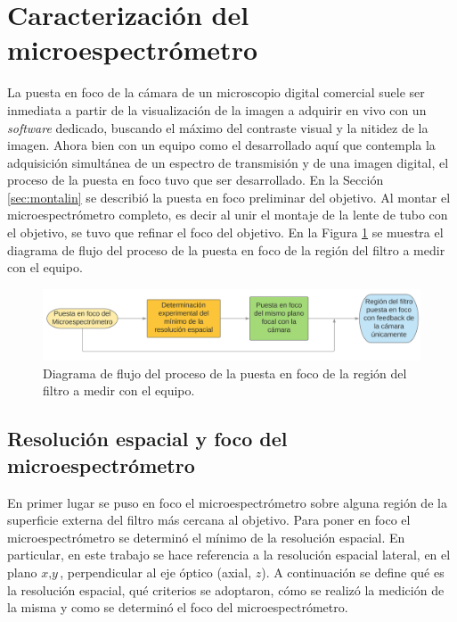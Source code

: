 \singlespacing
\section{Caracterización del microespectrómetro}
\label{sec:caractequipo}

\hspace{0.5cm}La puesta en foco de la cámara de un microscopio digital comercial suele ser inmediata a partir de la visualización de la imagen a adquirir en vivo con un \textit{software} dedicado, buscando el máximo del contraste visual y la nitidez de la imagen. Ahora bien con un equipo como el desarrollado aquí que contempla la adquisición simultánea de un espectro de transmisión y de una imagen digital, el proceso de la puesta en foco tuvo que ser desarrollado. En la Sección \ref{sec:montalin} se describió la puesta en foco preliminar del objetivo. Al montar el microespectrómetro completo, es decir al unir el montaje de la lente de tubo con el objetivo, se tuvo que refinar el foco del objetivo. En la Figura \ref{fig:diagpuestfoc} se muestra el diagrama de flujo del proceso de la puesta en foco de la región del filtro a medir con el equipo.

\begin{figure}[H]
	\centering
	\includegraphics[width=1.0\textwidth]{Figs/microespectrometro/diagramfoco.png}
	\caption{Diagrama de flujo del proceso de la puesta en foco de la región del filtro a medir con el equipo.}
	\label{fig:diagpuestfoc}
\end{figure}




\singlespacing
\subsection{Resolución espacial y foco del microespectrómetro}
\label{sec:focoresol}

\hspace{0.5cm}En primer lugar se puso en foco el microespectrómetro sobre alguna región de la superficie externa del filtro más cercana al objetivo. Para poner en foco el microespectrómetro se determinó el mínimo de la resolución espacial. En particular, en este trabajo se hace referencia a la resolución espacial lateral, en el plano $\textit{x},\textit{y}$, perpendicular al eje óptico (axial, $\textit{z}$). A continuación se define qué es la resolución espacial, qué criterios se adoptaron, cómo se realizó la medición de la misma y como se determinó el foco del microespectrómetro.


